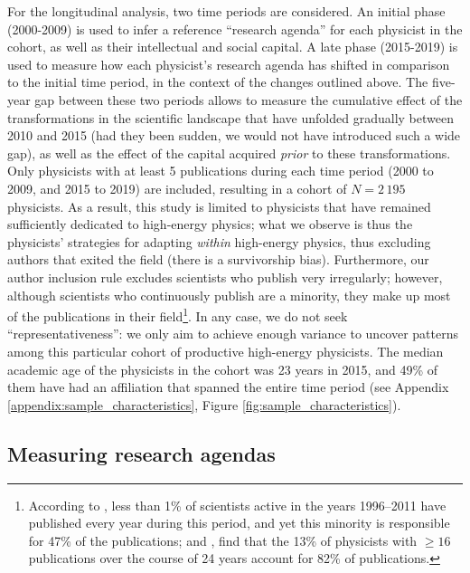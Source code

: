 \documentclass{article}
\begin{document}
For the longitudinal analysis, two time periods are considered. An initial phase (2000-2009) is used to infer a reference ``research agenda'' for each physicist in the cohort, as well as their intellectual and social capital. A late phase (2015-2019) is used to measure how each physicist's research agenda has shifted in comparison to the initial time period, in the context of the changes outlined above. The five-year gap between these two periods allows to measure the cumulative effect of the transformations in the scientific landscape that have unfolded gradually between 2010 and 2015 (had they been sudden, we would not have introduced such a wide gap), as well as the effect of the capital acquired \textit{prior} to these transformations. Only physicists with at least 5 publications during each time period (2000 to 2009, and 2015 to 2019) are included, resulting in a cohort of $N=2\,195$ physicists. As a result, this study is limited to physicists that have remained sufficiently dedicated to high-energy physics; what we observe is thus the physicists' strategies for adapting \textit{within} high-energy physics, thus excluding authors that exited the field (there is a survivorship bias). Furthermore, our author inclusion rule excludes scientists who publish very irregularly; however, although scientists who continuously publish are a minority, they make up most of the publications in their field\footnote{According to  \citet{Ioannidis2014}, less than 1\% of scientists active in the years 1996–2011 have published every year during this period, and yet this minority is responsible for 47\% of the publications; and \citet{Feifan2023}, find that the 13\% of physicists with $\geq 16$ publications over the course of 24 years account for 82\% of publications.}. In any case, we do not seek ``representativeness'': we only aim to achieve enough variance to uncover patterns among this particular cohort of productive high-energy physicists. The median academic age of the physicists in the cohort was 23 years in 2015, and 49\% of them have had an affiliation that spanned the entire time period (see Appendix \ref{appendix:sample_characteristics}, Figure \ref{fig:sample_characteristics}). 

\subsection{\label{sec:topics}Measuring research agendas}
\end{document}
